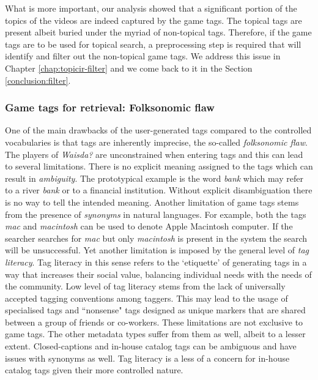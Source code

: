What is more important, our analysis showed that a significant portion of the topics of the videos are indeed captured by the game tags. The topical tags are present albeit buried under the myriad of non-topical tags. Therefore, if the game tags are to be used for topical search, a preprocessing step is required that will identify and filter out the non-topical game tags. We address this issue in Chapter \ref{chap:topicir-filter} and we come back to it in the Section \ref{conclusion:filter}.

\subsubsection{Game tags for retrieval: Folksonomic flaw}\label{conclusion:folsonomy-flaw}
One of the main drawbacks of the user-generated tags compared to the controlled vocabularies is that tags are inherently imprecise, the so-called \textit{folksonomic flaw}. %
The players of \textit{Waisda?} are unconstrained when entering tags and this can lead to several limitations. There is no explicit meaning assigned to the tags which can result in \textit{ambiguity}. 
The prototypical example is the word \textit{bank} which may refer to a river \textit{bank} or to a financial institution.
Without explicit disambiguation there is no way to tell the intended meaning. Another limitation of game tags stems from the presence of \textit{synonyms} in natural languages. For example, both the tags \textit{mac} and \textit{macintosh} can be used to denote Apple Macintosh computer. If the searcher searches for \textit{mac} but only \textit{macintosh} is present in the system the search will be unsuccessful.
Yet another limitation is imposed by the general level of \textit{tag literacy}. 
Tag literacy in this sense refers to the `etiquette' of generating tags in a way that increases their social value, balancing individual needs with the needs of the community. Low level of tag literacy stems from the lack of universally accepted tagging conventions among taggers.
This may lead to the usage of specialised tags and ``nonsense" tags designed as unique markers that are shared between a group of friends or co-workers. These limitations are not exclusive to game tags. The other metadata types suffer from them as well, albeit to a lesser extent. Closed-captions and in-house catalog tags can be ambiguous and have issues with synonyms as well. Tag literacy is a less of a concern for in-house catalog tags given their more controlled nature. 

